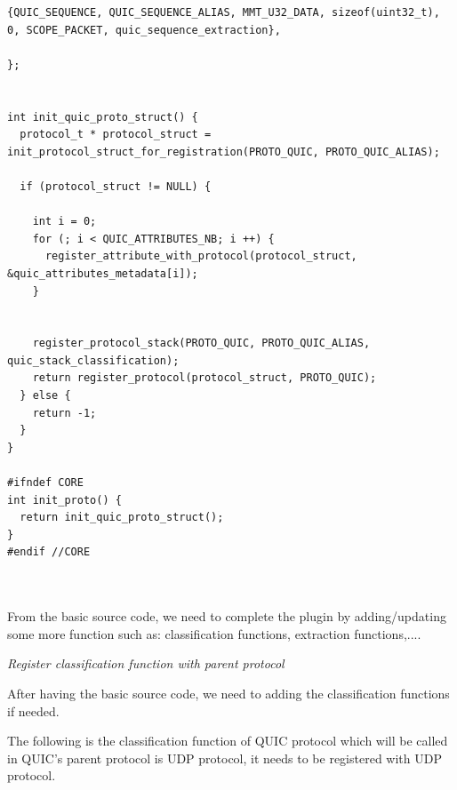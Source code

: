 \begin{lstlisting}[style=Cpp]
  {QUIC_SEQUENCE, QUIC_SEQUENCE_ALIAS, MMT_U32_DATA, sizeof(uint32_t), 0, SCOPE_PACKET, quic_sequence_extraction},

};


int init_quic_proto_struct() {
  protocol_t * protocol_struct = init_protocol_struct_for_registration(PROTO_QUIC, PROTO_QUIC_ALIAS);

  if (protocol_struct != NULL) {

    int i = 0;
    for (; i < QUIC_ATTRIBUTES_NB; i ++) {
      register_attribute_with_protocol(protocol_struct, &quic_attributes_metadata[i]);
    }


    register_protocol_stack(PROTO_QUIC, PROTO_QUIC_ALIAS, quic_stack_classification);
    return register_protocol(protocol_struct, PROTO_QUIC);
  } else {
    return -1;
  }
}

#ifndef CORE
int init_proto() {
  return init_quic_proto_struct();
}
#endif //CORE



\end{lstlisting}


From the basic source code, we need to complete the plugin by adding/updating some more function such as: classification functions, extraction functions,....

\textit{Register classification function with parent protocol}

After having the basic source code, we need to adding the classification functions if needed.

The following is the classification function of QUIC protocol which will be called in QUIC's parent protocol is UDP protocol, it needs to be registered with UDP protocol.

